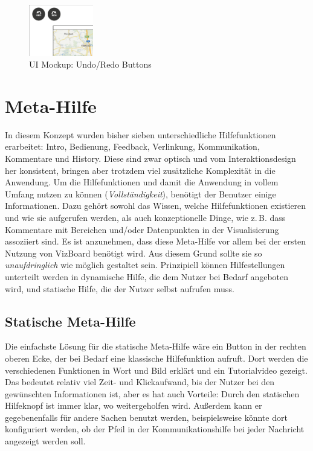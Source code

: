 \documentclass[
	headsepline,
	footsepline,
	fontsize=12pt,
	bibliography=totoc
]{scrbook}
\begin{document}
\begin{figure}[htbp]
   \centering
   \includegraphics[width=0.25\textwidth]{images/konzeption-undo-simple.png}
   \caption{UI Mockup: Undo/Redo Buttons}
   \label{figure:undo-simple}
\end{figure}


\section{Meta-Hilfe}
\label{section:konzeption:meta-hilfe}


In diesem Konzept wurden bisher sieben unterschiedliche Hilfefunktionen erarbeitet: Intro, Bedienung, Feedback, Verlinkung, Kommunikation, Kommentare und History. Diese sind zwar optisch und vom Interaktionsdesign her konsistent, bringen aber trotzdem viel zusätzliche Komplexität in die Anwendung. Um die Hilfefunktionen und damit die Anwendung in vollem Umfang nutzen zu können (\emph{Vollständigkeit}), benötigt der Benutzer einige Informationen. Dazu gehört sowohl das Wissen, welche Hilfefunktionen existieren und wie sie aufgerufen werden, als auch konzeptionelle Dinge, wie z.\,B. dass Kommentare mit Bereichen und/oder Datenpunkten in der Visualisierung assoziiert sind. Es ist anzunehmen, dass diese Meta-Hilfe vor allem bei der ersten Nutzung von VizBoard benötigt wird. Aus diesem Grund sollte sie so \emph{unaufdringlich} wie möglich gestaltet sein. Prinzipiell können Hilfestellungen unterteilt werden in dynamische Hilfe, die dem Nutzer bei Bedarf angeboten wird, und statische Hilfe, die der Nutzer selbst aufrufen muss.

\subsection{Statische Meta-Hilfe}


Die einfachste Lösung für die statische Meta-Hilfe wäre ein Button in der rechten oberen Ecke, der bei Bedarf eine klassische Hilfefunktion aufruft. Dort werden die verschiedenen Funktionen in Wort und Bild erklärt und ein Tutorialvideo gezeigt. Das bedeutet relativ viel Zeit- und Klickaufwand, bis der Nutzer bei den gewünschten Informationen ist, aber es hat auch Vorteile: Durch den statischen Hilfeknopf ist immer klar, wo weitergeholfen wird. Außerdem kann er gegebenenfalls für andere Sachen benutzt werden, beispielsweise könnte dort konfiguriert werden, ob der Pfeil in der Kommunikationshilfe bei jeder Nachricht angezeigt werden soll.
\end{document}
